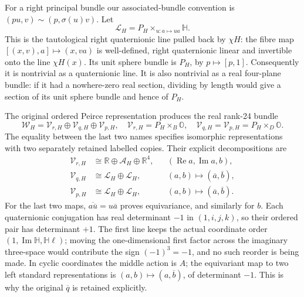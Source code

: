 For a right principal bundle our associated-bundle convention is
$(p u,v)\sim(p,\sigma(u)v)$. Let
\[
 \mathcal L_H=P_H\times_{u:a\mapsto u a}\mathbb H.
\]
This is the tautological right quaternionic line pulled back by
$\chi H$: the fibre map $[(x,v),a]\mapsto (x,v a)$ is
well-defined, right quaternionic linear and invertible onto the
line $\chi H(x)$. Its unit sphere bundle is $P_H$, by
$p\mapsto[p,1]$. Consequently it is nontrivial as a quaternionic
line. It is also nontrivial as a real four-plane bundle: if it had
a nowhere-zero real section, dividing by length would give a
section of its unit sphere bundle and hence of $P_H$.

The original ordered Peirce representation produces the real
rank-24 bundle
\begin{equation}
 \mathcal W_H=\mathcal V_{r,H}\oplus\mathcal V_{q,H}
                              \oplus\mathcal V_{p,H},
 \quad
 \mathcal V_{r,H}=P_H\times_B\mathbb O,
 \quad
 \mathcal V_{q,H}=\mathcal V_{p,H}=P_H\times_D\mathbb O.
 \label{h24:rettri:W}
\end{equation}
The equality between the last two names specifies isomorphic
representations with two separately retained labelled copies.
Their explicit decompositions are
\begin{equation}
 \begin{aligned}
 \mathcal V_{r,H}&\cong
       \mathbb R\oplus\mathcal A_H\oplus\mathbb R^4,
       &&(\operatorname{Re}a,\operatorname{Im}a,b),\\
 \mathcal V_{q,H}&\cong\mathcal L_H\oplus\mathcal L_H,
       &&(a,b)\longmapsto(\overline a,\overline b),\\
 \mathcal V_{p,H}&\cong\mathcal L_H\oplus\mathcal L_H,
       &&(a,b)\longmapsto(\overline a,\overline b).
 \end{aligned}
 \label{h24:rettri:splittings}
\end{equation}
For the last two maps,
$\overline{a\overline u}=u\overline a$ proves equivariance,
and similarly for $b$. Each quaternionic conjugation has real
determinant $-1$ in $(1,i,j,k)$, so their ordered pair has
determinant $+1$. The first line keeps the actual coordinate order
$(1,\operatorname{Im}\mathbb H,\mathbb H\ell)$; moving the
one-dimensional first factor across the imaginary three-space
would contribute the sign $(-1)^3=-1$, and no such reorder is
being made. In cyclic coordinates the middle action is $A$;
the equivariant map to two left standard representations is
$(a,b)\mapsto(a,\overline b)$, of determinant $-1$. This is
why the original $\overline q$ is retained explicitly.

